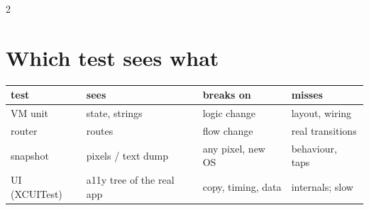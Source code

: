 \documentclass[8pt]{extarticle}
\begin{document}
\begin{multicols}{2}
\section{Which test sees what}
{\scriptsize\setlength{\tabcolsep}{2pt}
\begin{tabular}{@{}>{\raggedright\arraybackslash}p{12mm}>{\raggedright\arraybackslash}p{20mm}>{\raggedright\arraybackslash}p{18mm}>{\raggedright\arraybackslash}p{23mm}@{}}
\toprule
\textbf{test} & \textbf{sees} & \textbf{breaks on} & \textbf{misses}\\
\midrule
VM unit & state, strings & logic change & layout, wiring\\
router & routes & flow change & real transitions\\
snapshot & pixels / text dump & any pixel, new OS & behaviour, taps\\
UI (XCUITest) & a11y tree of the real app & copy, timing, data & internals; slow\\
\bottomrule
\end{tabular}}

\end{multicols}

\end{document}
